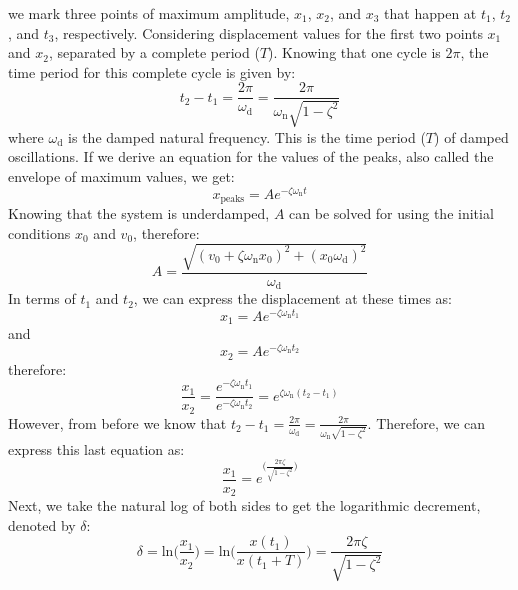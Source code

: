 \documentclass[12pt,letter]{article}
\begin{document}
			\noindent we mark three points of maximum amplitude, $x_1$, $x_2$, and $x_3$ that happen at $t_1$, $t_2$, and $t_3$, respectively. Considering displacement values for the first two points $x_1$ and $x_2$, separated by a complete period ($T$).  Knowing that one cycle is $2 \pi$, the time period for this complete cycle is given by:
			\begin{equation}
				t_2-t_1 = \frac{2\pi}{\omega_\text{d}} = \frac{2\pi}{\omega_\text{n}\sqrt{1-\zeta^2}}
			\end{equation}				
			where $\omega_\text{d}$ is the damped natural frequency. This is the time period ($T$) of damped oscillations. If we derive an equation for the values of the peaks, also called the envelope of maximum values, we get: 
			\begin{equation}
				x_{\text{peaks}} = Ae^{-\zeta\omega_\text{n}t} 
			\end{equation} 		
			Knowing that the system is underdamped, $A$ can be solved for using the initial conditions $x_0$ and $v_0$, therefore: 
			\begin{equation}
				A = \frac{\sqrt{(v_0+\zeta\omega_\text{n}x_0)^2 + (x_0\omega_\text{d})^2}}{\omega_\text{d}}
			\end{equation} 	
			In terms of $t_1$ and $t_2$, we can express the displacement at these times as:
			\begin{equation}
				x_{\text{1}} = A e^{-\zeta \omega_\text{n} t_1}
			\end{equation}				
			and 
			\begin{equation}
				x_{\text{2}} = A e^{-\zeta \omega_\text{n} t_2}
			\end{equation}		
			therefore:
			\begin{equation}
				\frac{x_{\text{1}}}{x_{\text{2}}} = \frac{e^{-\zeta \omega_\text{n} t_1}}{e^{-\zeta \omega_\text{n} t_2}} = e^{\zeta \omega_\text{n}(t_2-t_1)}
			\end{equation}		
			However, from before we know that $t_2-t_1 = \frac{2\pi}{\omega_\text{d}} = \frac{2\pi}{\omega_\text{n}\sqrt{1-\zeta^2}}$. Therefore, we can express this last equation as:
			\begin{equation}
				\frac{x_{\text{1}}}{x_{\text{2}}} =e^{\Big(\frac{2 \pi \zeta}{\sqrt{1-\zeta^2}}\Big)}
			\end{equation}			
			Next, we take the natural log of both sides to get the logarithmic decrement, denoted by $\delta$:
			\begin{equation}
				\delta = \text{ln}\bigg(\frac{x_{\text{1}}}{x_{\text{2}}}\bigg) = \text{ln}\bigg(\frac{x(t_{\text{1}})}{x(t_{\text{1}}+T)}\bigg) = \frac{2 \pi \zeta}{\sqrt{1-\zeta^2}}
			\end{equation}				
\end{document}
